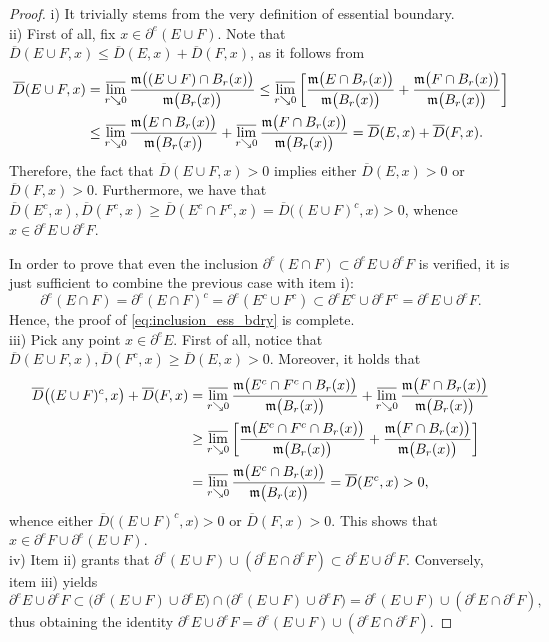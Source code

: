 \documentclass[reqno]{amsart}
\numberwithin{equation}{section}
\newcommand{\mm}{\mathfrak m}
\newcommand{\1}{\mathbbm 1}
\newcommand{\lims}{\varlimsup}
\begin{document}
\begin{proof} {\color{blue}i)} It trivially stems from the very definition
of essential boundary.\\ 
{\color{blue}ii)} First of all, fix \(x\in\partial^e(E\cup F)\).
Note that \(\overline D(E\cup F,x)\leq\overline D(E,x)+\overline D(F,x)\),
as it follows from
\[\begin{split}
\overline D(E\cup F,x)
&=\lims_{r\searrow 0}\frac{\mm\big((E\cup F)\cap B_r(x)\big)}{\mm\big(B_r(x)\big)}
\leq\lims_{r\searrow 0}\bigg[\frac{\mm\big(E\cap B_r(x)\big)}{\mm\big(B_r(x)\big)}
+\frac{\mm\big(F\cap B_r(x)\big)}{\mm\big(B_r(x)\big)}\bigg]\\
&\leq\lims_{r\searrow 0}\frac{\mm\big(E\cap B_r(x)\big)}{\mm\big(B_r(x)\big)}
+\lims_{r\searrow 0}\frac{\mm\big(F\cap B_r(x)\big)}{\mm\big(B_r(x)\big)}
=\overline D(E,x)+\overline D(F,x).
\end{split}\]
Therefore, the fact that \(\overline D(E\cup F,x)>0\) implies either
\(\overline D(E,x)>0\) or \(\overline D(F,x)>0\). Furthermore, we have
that \(\overline D(E^c,x),\overline D(F^c,x)\geq\overline D(E^c\cap F^c,x)
=\overline D\big((E\cup F)^c,x\big)>0\), whence \(x\in\partial^e E\cup\partial^e F\).

In order to prove that even the inclusion
\(\partial^e(E\cap F)\subset\partial^e E\cup\partial^e F\) is verified,
it is just sufficient to combine the previous case with item i):
\[
\partial^e(E\cap F)=\partial^e(E\cap F)^c=\partial^e(E^c\cup F^c)
\subset\partial^e E^c\cup\partial^e F^c=\partial^e E\cup\partial^e F.
\]
Hence, the proof of \eqref{eq:inclusion_ess_bdry} is complete.\\
{\color{blue}iii)} Pick any point \(x\in\partial^e E\). First of all, notice
that \(\overline D(E\cup F,x),\overline D(F^c,x)\geq\overline D(E,x)>0\).
Moreover, it holds that
\[\begin{split}
\overline D\big((E\cup F)^c,x\big)+\overline D(F,x)
&=\lims_{r\searrow 0}\frac{\mm\big(E^c\cap F^c\cap B_r(x)\big)}{\mm\big(B_r(x)\big)}
+\lims_{r\searrow 0}\frac{\mm\big(F\cap B_r(x)\big)}{\mm\big(B_r(x)\big)}\\
&\geq\lims_{r\searrow 0}\bigg[\frac{\mm\big(E^c\cap F^c\cap B_r(x)\big)}
{\mm\big(B_r(x)\big)}+\frac{\mm\big(F\cap B_r(x)\big)}{\mm\big(B_r(x)\big)}\bigg]\\
&=\lims_{r\searrow 0}\frac{\mm\big(E^c\cap B_r(x)\big)}{\mm\big(B_r(x)\big)}
=\overline D(E^c,x)>0,
\end{split}\]
whence either \(\overline D\big((E\cup F)^c,x\big)>0\) or \(\overline D(F,x)>0\).
This shows that \(x\in\partial^e F\cup\partial^e(E\cup F)\).\\
{\color{blue}iv)} Item ii) grants that
\(\partial^e(E\cup F)\cup(\partial^e E\cap\partial^e F)\subset
\partial^e E\cup\partial^e F\). Conversely, item iii) yields
\[
\partial^e E\cup\partial^e F\subset\big(\partial^e(E\cup F)\cup\partial^e E\big)
\cap\big(\partial^e(E\cup F)\cup\partial^e F\big)
=\partial^e(E\cup F)\cup(\partial^e E\cap\partial^e F),
\]
thus obtaining the identity \(\partial^e E\cup\partial^e F=
\partial^e(E\cup F)\cup(\partial^e E\cap\partial^e F)\).
\end{proof}
\end{document}
